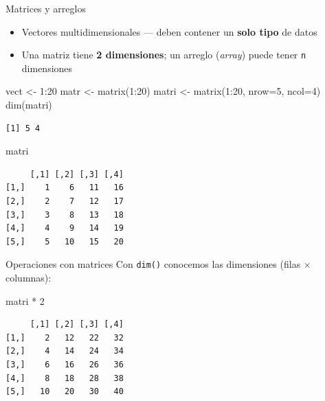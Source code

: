 \documentclass[
  9pt,
  ignorenonframetext,
]{beamer}
\newenvironment{Shaded}{\begin{snugshade}}{\end{snugshade}}
\newcommand{\AttributeTok}[1]{\textcolor[rgb]{0.40,0.45,0.13}{#1}}
\newcommand{\DecValTok}[1]{\textcolor[rgb]{0.68,0.00,0.00}{#1}}
\newcommand{\FunctionTok}[1]{\textcolor[rgb]{0.28,0.35,0.67}{#1}}
\newcommand{\NormalTok}[1]{\textcolor[rgb]{0.00,0.23,0.31}{#1}}
\newcommand{\OtherTok}[1]{\textcolor[rgb]{0.00,0.23,0.31}{#1}}
\newcommand{\SpecialCharTok}[1]{\textcolor[rgb]{0.37,0.37,0.37}{#1}}
\providecommand{\tightlist}{%
  \setlength{\itemsep}{0pt}\setlength{\parskip}{0pt}}\usepackage{longtable,booktabs,array}
\begin{document}
\begin{frame}[fragile]{Matrices y arreglos}
\label{matrices-y-arreglos}
\begin{itemize}
\tightlist
\item
  Vectores multidimensionales --- deben contener un \textbf{solo tipo}
  de datos
\item
  Una matriz tiene \textbf{2 dimensiones}; un arreglo (\emph{array})
  puede tener \texttt{n} dimensiones
\end{itemize}

\begin{Shaded}
\begin{Highlighting}[]
\NormalTok{vect  }\OtherTok{\textless{}{-}} \DecValTok{1}\SpecialCharTok{:}\DecValTok{20}
\NormalTok{matr  }\OtherTok{\textless{}{-}} \FunctionTok{matrix}\NormalTok{(}\DecValTok{1}\SpecialCharTok{:}\DecValTok{20}\NormalTok{)}
\NormalTok{matri }\OtherTok{\textless{}{-}} \FunctionTok{matrix}\NormalTok{(}\DecValTok{1}\SpecialCharTok{:}\DecValTok{20}\NormalTok{, }\AttributeTok{nrow=}\DecValTok{5}\NormalTok{, }\AttributeTok{ncol=}\DecValTok{4}\NormalTok{)}
\FunctionTok{dim}\NormalTok{(matri)}
\end{Highlighting}
\end{Shaded}

\begin{verbatim}
[1] 5 4
\end{verbatim}

\begin{Shaded}
\begin{Highlighting}[]
\NormalTok{matri}
\end{Highlighting}
\end{Shaded}

\begin{verbatim}
     [,1] [,2] [,3] [,4]
[1,]    1    6   11   16
[2,]    2    7   12   17
[3,]    3    8   13   18
[4,]    4    9   14   19
[5,]    5   10   15   20
\end{verbatim}
\end{frame}

\begin{frame}[fragile]{Operaciones con matrices}
\label{operaciones-con-matrices}
Con \texttt{dim()} conocemos las dimensiones (filas × columnas):

\begin{Shaded}
\begin{Highlighting}[]
\NormalTok{matri }\SpecialCharTok{*} \DecValTok{2}
\end{Highlighting}
\end{Shaded}

\begin{verbatim}
     [,1] [,2] [,3] [,4]
[1,]    2   12   22   32
[2,]    4   14   24   34
[3,]    6   16   26   36
[4,]    8   18   28   38
[5,]   10   20   30   40
\end{verbatim}
\end{frame}
\end{document}
